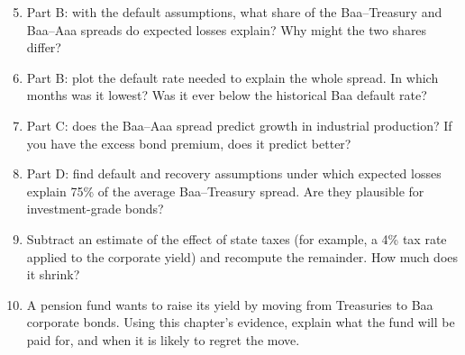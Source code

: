 \begin{enumerate}
  \setcounter{enumi}{4}
  \item Part B: with the default assumptions, what share of the Baa--Treasury and Baa--Aaa spreads do expected losses explain? Why might the two shares differ?
  \item Part B: plot the default rate needed to explain the whole spread. In which months was it lowest? Was it ever below the historical Baa default rate?
  \item Part C: does the Baa--Aaa spread predict growth in industrial production? If you have the excess bond premium, does it predict better?
  \item Part D: find default and recovery assumptions under which expected losses explain 75\% of the average Baa--Treasury spread. Are they plausible for investment-grade bonds?
  \item Subtract an estimate of the effect of state taxes (for example, a 4\% tax rate applied to the corporate yield) and recompute the remainder. How much does it shrink?
  \item A pension fund wants to raise its yield by moving from Treasuries to Baa corporate bonds. Using this chapter's evidence, explain what the fund will be paid for, and when it is likely to regret the move.
\end{enumerate}
